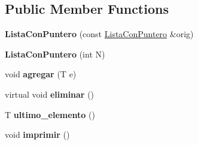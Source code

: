 \subsection*{Public Member Functions}
\begin{DoxyCompactItemize}
\item 
\hypertarget{class_lista_con_puntero_ae7de4e8c809b2b2e3f5ded5279f4cb13}{{\bfseries Lista\+Con\+Puntero} (const \hyperlink{class_lista_con_puntero}{Lista\+Con\+Puntero} \&orig)}\label{class_lista_con_puntero_ae7de4e8c809b2b2e3f5ded5279f4cb13}

\item 
\hypertarget{class_lista_con_puntero_a22c72f33bd09f3e8f4df32949add7b5a}{{\bfseries Lista\+Con\+Puntero} (int N)}\label{class_lista_con_puntero_a22c72f33bd09f3e8f4df32949add7b5a}

\item 
\hypertarget{class_lista_con_puntero_afc679c900335d45da5f47e5742fc75fa}{void {\bfseries agregar} (T e)}\label{class_lista_con_puntero_afc679c900335d45da5f47e5742fc75fa}

\item 
\hypertarget{class_lista_con_puntero_ab305edeecf878b5c3711a6a59c9622eb}{virtual void {\bfseries eliminar} ()}\label{class_lista_con_puntero_ab305edeecf878b5c3711a6a59c9622eb}

\item 
\hypertarget{class_lista_con_puntero_a0e5d388bf9d8ebcfd52eb470939d51c3}{T {\bfseries ultimo\+\_\+elemento} ()}\label{class_lista_con_puntero_a0e5d388bf9d8ebcfd52eb470939d51c3}

\item 
\hypertarget{class_lista_con_puntero_a99b8e8cfa4c23b07a9a35a55034827fb}{void {\bfseries imprimir} ()}\label{class_lista_con_puntero_a99b8e8cfa4c23b07a9a35a55034827fb}

\end{DoxyCompactItemize}
